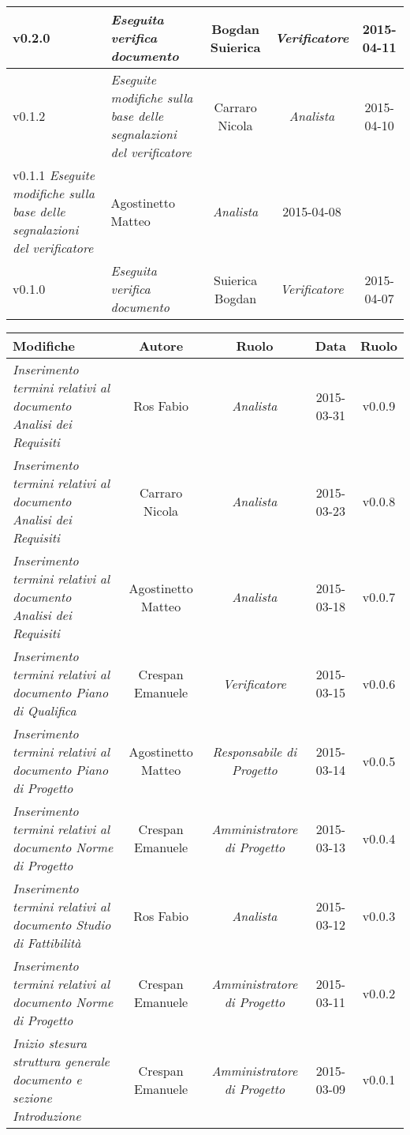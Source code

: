 \begin{table}[H]
\begin{tabular}{|p{}|p{}|c|c|c|}
	\midrule
		v0.2.0 & \textit{Eseguita verifica documento} & Bogdan Suierica & \textit{Verificatore} & 2015-04-11 \\
	\midrule
		v0.1.2 & \textit{Eseguite modifiche sulla base delle segnalazioni del verificatore} & Carraro Nicola & \textit{Analista} & 2015-04-10 \\
	\midrule
		v0.1.1 \textit{Eseguite modifiche sulla base delle segnalazioni del verificatore} & Agostinetto Matteo & \textit{Analista} & 2015-04-08 \\
	\midrule
		v0.1.0 & \textit{Eseguita verifica documento} & Suierica Bogdan & \textit{Verificatore} & 2015-04-07 \\
	\bottomrule
\end{tabular}	
\end{table}

\newpage

\begin{table}[h]
\centering
\begin{tabular}{|p{}|c|c|c|c|}
	\toprule
		\textbf{Modifiche} & \textbf{Autore} & \textbf{Ruolo} & \textbf{Data} & \textbf{Ruolo} \\
	\midrule
	\midrule
		\textit{Inserimento termini relativi al documento Analisi dei Requisiti} & Ros Fabio & \textit{Analista} & 2015-03-31 & v0.0.9 \\
	\midrule
		\textit{Inserimento termini relativi al documento Analisi dei Requisiti} & Carraro Nicola & \textit{Analista} & 2015-03-23 & v0.0.8 \\
	\midrule
		\textit{Inserimento termini relativi al documento Analisi dei Requisiti} & Agostinetto Matteo & \textit{Analista} & 2015-03-18 & v0.0.7 \\
	\midrule
		\textit{Inserimento termini relativi al documento Piano di Qualifica} & Crespan Emanuele & \textit{Verificatore} & 2015-03-15 & v0.0.6 \\
	\midrule
		\textit{Inserimento termini relativi al documento Piano di Progetto} & Agostinetto Matteo & \textit{Responsabile di Progetto} & 2015-03-14 & v0.0.5 \\
	\midrule
		\textit{Inserimento termini relativi al documento Norme di Progetto} & Crespan Emanuele & \textit{Amministratore di Progetto} & 2015-03-13 & v0.0.4 \\
	\midrule
		\textit{Inserimento termini relativi al documento Studio di Fattibilità} & Ros Fabio & \textit{Analista} & 2015-03-12 & v0.0.3 \\
	\midrule
		\textit{Inserimento termini relativi al documento Norme di Progetto} & Crespan Emanuele & \textit{Amministratore di Progetto} & 2015-03-11 & v0.0.2 \\	                         
	\midrule
		\textit{Inizio stesura struttura generale documento e sezione Introduzione} & Crespan Emanuele & \textit{Amministratore di Progetto} & 2015-03-09 & v0.0.1 \\
	\bottomrule
\end{tabular}	
\end{table}

\newpage